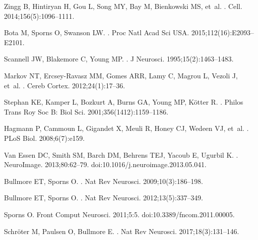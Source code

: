 \documentclass[10pt,letterpaper]{article}
\begin{document}
{\begin{thebibliography}{100}
Zingg B, Hintiryan H, Gou L, Song MY, Bay M, Bienkowski MS, et~al.
.
\newblock Cell. 2014;156(5):1096--1111.

Bota M, Sporns O, Swanson LW.
.
\newblock Proc Natl Acad Sci USA. 2015;112(16):E2093--E2101.

Scannell JW, Blakemore C, Young MP.
.
\newblock J Neurosci. 1995;15(2):1463--1483.

Markov NT, Ercsey-Ravasz MM, Gomes ARR, Lamy C, Magrou L, Vezoli J, et~al.
.
\newblock Cereb Cortex. 2012;24(1):17--36.

Stephan KE, Kamper L, Bozkurt A, Burns GA, Young MP, K{\"o}tter R.
.
\newblock Philos Trans Roy Soc B: Biol Sci. 2001;356(1412):1159--1186.

Hagmann P, Cammoun L, Gigandet X, Meuli R, Honey CJ, Wedeen VJ, et~al.
.
\newblock PLoS Biol. 2008;6(7):e159.

{Van Essen} DC, Smith SM, Barch DM, Behrens TEJ, Yacoub E, Ugurbil K.
.
\newblock NeuroImage. 2013;80:62--79.
\newblock doi:{10.1016/j.neuroimage.2013.05.041}.

Bullmore ET, Sporns O.
.
\newblock Nat Rev Neurosci. 2009;10(3):186--198.

Bullmore ET, Sporns O.
.
\newblock Nat Rev Neurosci. 2012;13(5):337--349.

Sporns O.
\newblock Front Comput Neurosci. 2011;5:5.
\newblock doi:{10.3389/fncom.2011.00005}.

Schr{\"o}ter M, Paulsen O, Bullmore E.
.
\newblock Nat Rev Neurosci. 2017;18(3):131--146.


\end{thebibliography}}
\end{document}
